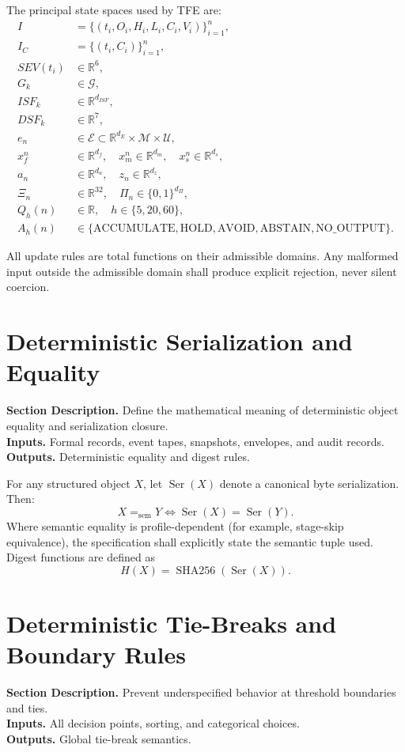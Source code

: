 \documentclass[11pt]{report}
\newcommand{\meta}[3]{\textbf{Section Description.} #1\\
\textbf{Inputs.} #2\\
\textbf{Outputs.} #3\par}
\begin{document}
The principal state spaces used by TFE are:
\begin{align*}
I &= \{(t_i,O_i,H_i,L_i,C_i,V_i)\}_{i=1}^{n},\\
I_C &= \{(t_i,C_i)\}_{i=1}^{n},\\
SEV(t_i) &\in \mathbb{R}^{6},\\
G_k &\in \mathcal{G},\\
ISF_k &\in \mathbb{R}^{d_{ISF}},\\
DSF_k &\in \mathbb{R}^{7},\\
e_n &\in \mathcal{E}\subset \mathbb{R}^{d_E}\times\mathcal{M}\times\mathcal{U},\\
x_f^n &\in \mathbb{R}^{d_f},\quad x_m^n \in \mathbb{R}^{d_m},\quad x_s^n\in\mathbb{R}^{d_s},\\
a_n &\in \mathbb{R}^{d_a},\quad z_n\in\mathbb{R}^{d_z},\\
\Xi_n &\in \mathbb{R}^{32},\quad \Pi_n\in\{0,1\}^{d_{\Pi}},\\
Q_h(n) &\in \mathbb{R},\quad h\in\{5,20,60\},\\
A_h(n) &\in \{\text{ACCUMULATE},\text{HOLD},\text{AVOID},\text{ABSTAIN},\text{NO\_OUTPUT}\}.
\end{align*}

All update rules are total functions on their admissible domains. Any malformed input outside the admissible domain shall produce explicit rejection, never silent coercion.

\section{Deterministic Serialization and Equality}
\meta{Define the mathematical meaning of deterministic object equality and serialization closure.}{Formal records, event tapes, snapshots, envelopes, and audit records.}{Deterministic equality and digest rules.}

For any structured object $X$, let $\operatorname{Ser}(X)$ denote a canonical byte serialization. Then:
\[
X =_{\mathrm{sem}} Y \iff \operatorname{Ser}(X)=\operatorname{Ser}(Y).
\]
Where semantic equality is profile-dependent (for example, stage-skip equivalence), the specification shall explicitly state the semantic tuple used. Digest functions are defined as
\[
H(X)=\operatorname{SHA256}(\operatorname{Ser}(X)).
\]

\section{Deterministic Tie-Breaks and Boundary Rules}
\meta{Prevent underspecified behavior at threshold boundaries and ties.}{All decision points, sorting, and categorical choices.}{Global tie-break semantics.}
\end{document}
